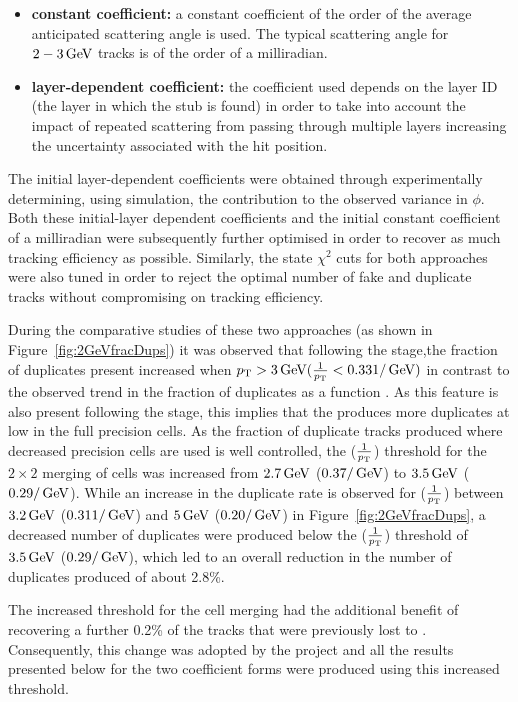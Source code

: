 \begin{itemize}
\item \textbf{constant coefficient:} a constant coefficient of the order of the average anticipated scattering angle is used. The typical scattering angle for $2-3\,\text{Ge\hspace{-.08em}V}$ tracks is of the order of a milliradian.
\item \textbf{layer-dependent coefficient:} the coefficient used depends on the layer ID (\ie the layer in which the stub is found) in order to take into account the impact of repeated scattering from passing through multiple layers increasing the uncertainty associated with the hit position.
\end{itemize}

The initial layer-dependent coefficients were obtained through experimentally determining, using simulation, the \MS contribution to the observed variance in $\phi$.
Both these initial-layer dependent coefficients and the initial constant coefficient of a milliradian were subsequently further optimised in order to recover as much tracking efficiency as  possible.
Similarly, the \KF state $\chi^{2}$ cuts for both approaches were also tuned in order to reject the optimal number of fake and duplicate tracks without compromising on tracking efficiency.

During the comparative studies of these two approaches (as shown in Figure~\ref{fig:2GeVfracDups}) it was observed that following the \DR stage,the fraction of duplicates present increased when $p_{\mathrm{T}} > 3\,\text{Ge\hspace{-.08em}V} (\frac{1}{p_{\mathrm{T}}} < 0.33 1/\,\text{Ge\hspace{-.08em}V})$ in contrast to the observed trend in the fraction of duplicates as a function \pT.
As this feature is also present following the \HT stage, this implies that the \HT produces more duplicates at low \pT in the full precision cells.
As the fraction of duplicate tracks produced where decreased precision \HT cells are used is well controlled, the \pT ($\frac{1}{p_{\mathrm{T}}}$) threshold for the $2 \times 2$ merging of \HT cells was increased from $2.7\,\text{Ge\hspace{-.08em}V}$ ($0.37/\,\text{Ge\hspace{-.08em}V}$) to $3.5\,\text{Ge\hspace{-.08em}V}$ ($0.29/\,\text{Ge\hspace{-.08em}V}$).
While an increase in the duplicate rate is observed for \pT ($\frac{1}{p_{\mathrm{T}}}$) between $3.2\,\text{Ge\hspace{-.08em}V}$ ($0.31 1/\,\text{Ge\hspace{-.08em}V}$) and $5\,\text{Ge\hspace{-.08em}V}$ ($0.20/\,\text{Ge\hspace{-.08em}V}$) in Figure~\ref{fig:2GeVfracDups}, a decreased number of duplicates were produced below the \pt ($\frac{1}{p_{\mathrm{T}}}$) threshold of $3.5\,\text{Ge\hspace{-.08em}V}$ ($0.29/\,\text{Ge\hspace{-.08em}V}$), which led to an overall reduction in the number of duplicates produced of about 2.8\%.

The increased \pT threshold for the \HT cell merging had the additional benefit of recovering a further 0.2\% of the tracks that were previously lost to \MS.
Consequently, this change was adopted by the project and all the results presented below for the two \MS coefficient forms were produced using this increased threshold. 

